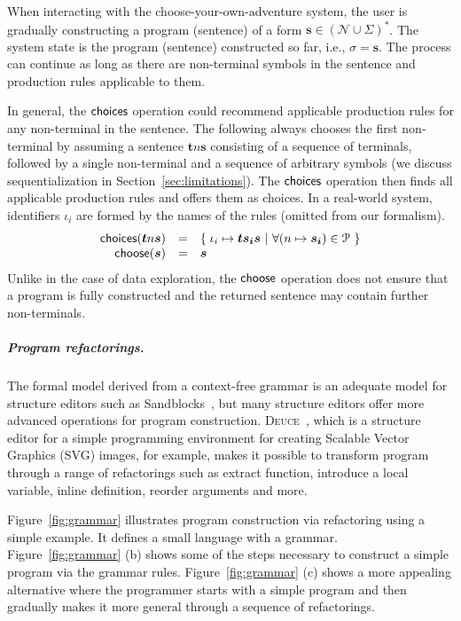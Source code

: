 \documentclass[a4paper,UKenglish,cleveref, autoref, thm-restate]{lipics-v2021}
\newcommand{\ident}[1]{\textsf{#1}}
\newcommand{\select}{\textnormal{\ident{choose}}}
\newcommand{\choices}{\textnormal{\ident{choices}}}
\begin{document}
When interacting with the choose-your-own-adventure system, the user is gradually constructing a
program (sentence) of a form $\boldsymbol{s}\in(\mathcal{N}\cup\Sigma)^{*}$. The system state is the program (sentence)
constructed so far, i.e., $\sigma = \boldsymbol{s}$. The process can continue
as long as there are non-terminal symbols in the sentence and production rules applicable to them.

In general, the $\choices$ operation could recommend applicable production rules for any
non-terminal in the sentence. The following always chooses the first non-terminal by assuming
a sentence $\boldsymbol{t}n\boldsymbol{s}$ consisting of a sequence of terminals, followed by a
single non-terminal and a sequence of arbitrary symbols (we discuss sequentialization
in Section~\ref{sec:limitations}). The $\choices$ operation then finds all applicable production
rules and offers them as choices. In a real-world system, identifiers $\iota_i$ are formed by
the names of the rules (omitted from our formalism).
\[
\begin{array}{rcl}
\choices(\boldsymbol{t}n\boldsymbol{s}) &=& \{\; \iota_i \mapsto \boldsymbol{t}\boldsymbol{s_i}\boldsymbol{s} ~|~ \forall (n\mapsto\boldsymbol{s_i})\in \mathcal{P} ~\}\\
\select(\boldsymbol{s}) &=& \boldsymbol{s}
\end{array}
\]
Unlike in the case of data exploration, the $\select$ operation does not ensure
that a program is fully constructed and the returned sentence may contain further non-terminals.

\subparagraph{Program refactorings.}
The formal model derived from a context-free grammar is an adequate model for structure
editors such as Sandblocks~\cite{beckmann-2023-all}, but many structure editors offer more
advanced operations for program construction. \textsc{Deuce}~\cite{hempel-2018-deuce},
which is a structure editor for a simple programming environment for creating Scalable
Vector Graphics (SVG) images, for example, makes it possible to transform program through
a range of refactorings such as extract function, introduce a local variable, inline definition,
reorder arguments and more.

Figure~\ref{fig:grammar} illustrates program construction via refactoring using a simple
example. It defines a small language with a grammar. Figure~\ref{fig:grammar} (b) shows some
of the steps necessary to construct a simple program via the grammar rules.
Figure~\ref{fig:grammar} (c) shows a more appealing alternative where the programmer starts
with a simple program and then gradually makes it more general through a sequence of refactorings.
\end{document}
